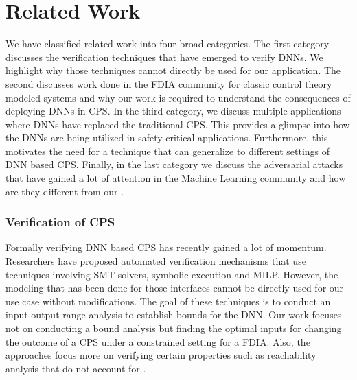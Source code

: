 \chapter{Related Work}
\label{ch:Chapter2}



We have classified related work into four broad categories. The first category discusses the verification techniques that have emerged to verify DNNs. We highlight why those techniques cannot directly be used for our application. The second discusses work done in the FDIA community for classic control theory modeled systems and why our work is required to understand the consequences of deploying DNNs in CPS.  In the third category, we discuss multiple applications where DNNs have replaced the traditional CPS. This provides a glimpse into how the DNNs are being utilized in safety-critical applications. Furthermore, this motivates the need for a technique that can generalize to different settings of DNN based CPS. Finally, in the last category we discuss the adversarial attacks that have gained a lot of attention in the Machine Learning community and how are they different from our \attack. 
\subsection{Verification of CPS}

Formally verifying DNN based CPS has recently gained a lot of momentum. Researchers have proposed automated verification mechanisms that use techniques involving SMT solvers, symbolic execution and MILP. However, the modeling that has been done for those interfaces cannot be directly used for our use case without modifications. The goal of these techniques is to conduct an input-output range analysis to establish bounds for the DNN. Our work focuses not on conducting a bound analysis but finding the optimal inputs for changing the outcome of a CPS under a constrained setting for a FDIA. Also, the approaches focus more on verifying certain properties such as reachability analysis that do not account for \attack.

